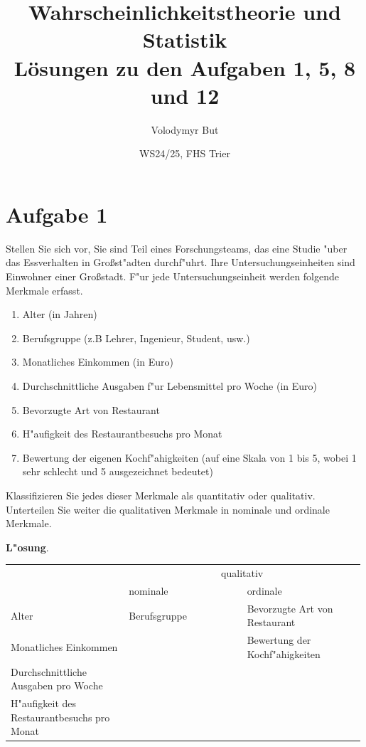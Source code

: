 \documentclass[10pt, a4paper, oneside]{article}
\title{Wahrscheinlichkeitstheorie und Statistik\\[5pt]\Large L{\"o}sungen zu den Aufgaben 1, 5, 8 und 12}
\author{Volodymyr But}
\date{WS24/25, FHS Trier}
\begin{document}
\maketitle
\vspace{25px}

\section{Aufgabe 1}

Stellen Sie sich vor, Sie sind Teil eines Forschungsteams, das eine Studie
"uber das Essverhalten in Großst"adten durchf"uhrt. Ihre Untersuchungseinheiten
sind Einwohner einer Großstadt. F"ur jede Untersuchungseinheit werden folgende
Merkmale erfasst.

\begin{enumerate}[-]
    \item Alter (in Jahren)
    \item Berufsgruppe (z.B Lehrer, Ingenieur, Student, usw.)
    \item Monatliches Einkommen (in Euro)
    \item Durchschnittliche Ausgaben f"ur Lebensmittel pro Woche (in Euro)
    \item Bevorzugte Art von Restaurant
    \item H"aufigkeit des Restaurantbesuchs pro Monat
    \item Bewertung der eigenen Kochf"ahigkeiten (auf eine Skala von 1 bis 5,
        wobei 1 sehr schlecht und 5 ausgezeichnet bedeutet)
\end{enumerate}

Klassifizieren Sie jedes dieser Merkmale als quantitativ oder qualitativ.
Unterteilen Sie weiter die qualitativen Merkmale in nominale und ordinale
Merkmale.

\textbf{L"osung}.

\bgroup
\def\arraystretch{1.5}
\begin{table}[h]
    \centering
    \begin{tabular}{p{0.33\linewidth}|p{0.33\linewidth}|p{0.33\linewidth}}
        \hfil\multirow{2}{*}{\centering quantitativ} & \multicolumn{2}{c}{qualitativ} \\
        \cline{2-3}
        & \hfil nominale & \hfil ordinale \\ \hline
        Alter & Berufsgruppe & Bevorzugte Art von Restaurant \\ \cline{1-1} \cline{3-3}
        Monatliches Einkommen & & Bewertung der Kochf"ahigkeiten \\ \cline{1-1}
        Durchschnittliche Ausgaben pro Woche & & \\ \cline{1-1}
        H"aufigkeit des Restaurantbesuchs pro Monat & &
    \end{tabular}
\end{table}
\egroup
\end{document}
